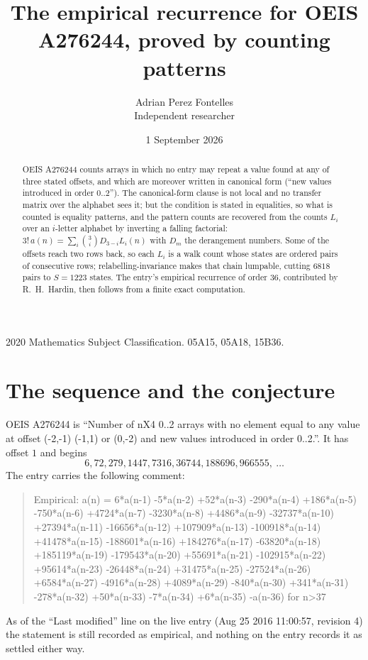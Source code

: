 \documentclass[11pt,a4paper]{article}
\title{The empirical recurrence for OEIS A276244, proved by counting patterns}
\author{Adrian Perez Fontelles\\ \small Independent researcher}
\date{1 September 2026}
\theoremstyle{plain}
\theoremstyle{definition}
\begin{document}
\maketitle

\begin{abstract}
OEIS A276244 counts arrays in which no entry may repeat a value found at any of three stated
offsets, and which are moreover written in canonical form (``new values introduced in order
$0..2$''). The canonical-form clause is not local and no transfer matrix over the
alphabet sees it; but the condition is stated in equalities, so what is counted is equality
patterns, and the pattern counts are recovered from the counts $L_i$ over an $i$-letter
alphabet by inverting a falling factorial:
$3!\,a(n)=\sum_i\binom{3}{i}D_{3-i}L_i(n)$ with $D_m$ the derangement numbers.
Some of the offsets reach two rows back, so each $L_i$ is a walk count whose states are
ordered pairs of consecutive rows; relabelling-invariance makes that chain lumpable,
cutting $6818$ pairs to $S=1223$ states. The entry's empirical recurrence of order $36$,
contributed by R.~H.~Hardin, then follows from a finite exact computation.
\end{abstract}

\noindent\small 2020 Mathematics Subject Classification. 05A15, 05A18, 15B36.\normalsize

\section{The sequence and the conjecture}

OEIS A276244 is ``Number of nX4 0..2 arrays with no element equal to any value at offset (-2,-1) (-1,1) or (0,-2) and new values introduced in order 0..2.''. It has offset $1$ and begins
\[
6, 72, 279, 1447, 7316, 36744, 188696, 966555,\ \dots
\]
The entry carries the following comment:
\begin{quote}\small
Empirical: a(n) = 6*a(n-1) -5*a(n-2) +52*a(n-3) -290*a(n-4) +186*a(n-5) -750*a(n-6) +4724*a(n-7) -3230*a(n-8) +4486*a(n-9) -32737*a(n-10) +27394*a(n-11) -16656*a(n-12) +107909*a(n-13) -100918*a(n-14) +41478*a(n-15) -188601*a(n-16) +184276*a(n-17) -63820*a(n-18) +185119*a(n-19) -179543*a(n-20) +55691*a(n-21) -102915*a(n-22) +95614*a(n-23) -26448*a(n-24) +31475*a(n-25) -27524*a(n-26) +6584*a(n-27) -4916*a(n-28) +4089*a(n-29) -840*a(n-30) +341*a(n-31) -278*a(n-32) +50*a(n-33) -7*a(n-34) +6*a(n-35) -a(n-36) for n>37
\end{quote}
As of the ``Last modified'' line on the live entry (Aug 25 2016 11:00:57, revision 4) the statement is
still recorded as empirical, and nothing on the entry records it as settled either way.
\end{document}
